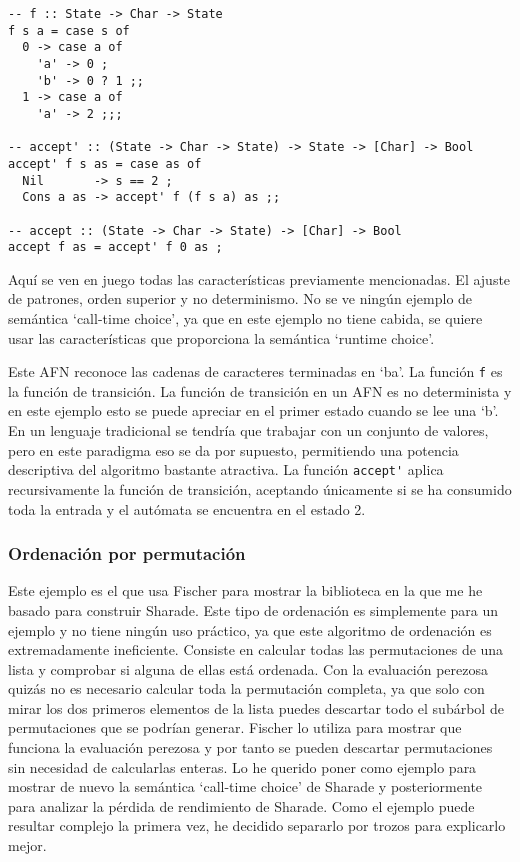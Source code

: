 \documentclass[class=article, crop=false]{standalone}
\begin{document}
\begin{verbatim}
-- f :: State -> Char -> State
f s a = case s of
  0 -> case a of
    'a' -> 0 ;
    'b' -> 0 ? 1 ;;
  1 -> case a of
    'a' -> 2 ;;;

-- accept' :: (State -> Char -> State) -> State -> [Char] -> Bool
accept' f s as = case as of
  Nil       -> s == 2 ;
  Cons a as -> accept' f (f s a) as ;;

-- accept :: (State -> Char -> State) -> [Char] -> Bool
accept f as = accept' f 0 as ;
\end{verbatim}

Aquí se ven en juego todas las características previamente mencionadas. El ajuste de
patrones, orden superior y no determinismo. No se ve ningún ejemplo de semántica `call-time
choice', ya que en este ejemplo no tiene cabida, se quiere usar las características que
proporciona la semántica `runtime choice'.

Este AFN reconoce las cadenas de caracteres terminadas en `ba'. La función \verb`f` es la
función de transición. La función de transición en un AFN es no determinista y en este
ejemplo esto se puede apreciar en el primer estado cuando se lee una `b'. En un lenguaje
tradicional se tendría que trabajar con un conjunto de valores, pero en este paradigma eso se
da por supuesto, permitiendo una potencia descriptiva del algoritmo bastante atractiva. La
función \verb`accept'` aplica recursivamente la función de transición, aceptando únicamente
si se ha consumido toda la entrada y el autómata se encuentra en el estado 2.

\subsubsection{Ordenación por permutación}

Este ejemplo es el que usa Fischer para mostrar la biblioteca en la que me he basado para
construir Sharade. Este tipo de ordenación es simplemente para un ejemplo y no tiene
ningún uso práctico, ya que este algoritmo de ordenación es extremadamente ineficiente.
Consiste en calcular todas las permutaciones de una lista y comprobar si alguna de ellas está
ordenada. Con la evaluación perezosa quizás no es necesario calcular toda la permutación
completa, ya que solo con mirar los dos primeros elementos de la lista puedes descartar todo
el subárbol de permutaciones que se podrían generar. Fischer lo utiliza para mostrar que
funciona la evaluación perezosa y por tanto se pueden descartar permutaciones sin necesidad
de calcularlas enteras. Lo he querido poner como ejemplo para mostrar de nuevo la semántica
`call-time choice' de Sharade y posteriormente para analizar la pérdida de rendimiento de
Sharade. Como el ejemplo puede resultar complejo la primera vez, he decidido separarlo por
trozos para explicarlo mejor.
\end{document}
